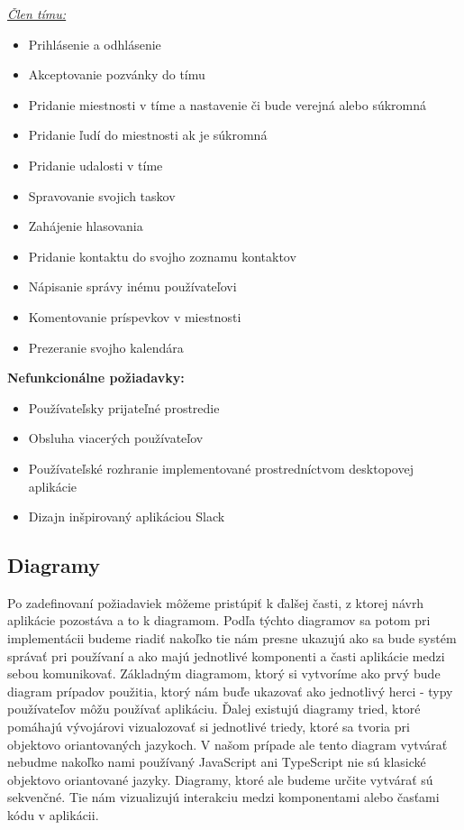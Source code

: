 \underline{\textit{Člen tímu:}}
\indent\begin{itemize}
    \item Prihlásenie a odhlásenie
    \item Akceptovanie pozvánky do tímu
    \item Pridanie miestnosti v tíme a nastavenie či bude verejná alebo súkromná
    \item Pridanie ľudí do miestnosti ak je súkromná
    \item Pridanie udalosti v tíme
    \item Spravovanie svojich taskov
    \item Zahájenie hlasovania
    \item Pridanie kontaktu do svojho zoznamu kontaktov
    \item Nápisanie správy inému používateľovi
    \item Komentovanie príspevkov v miestnosti
    \item Prezeranie svojho kalendára\newline
\end{itemize}


\textbf{Nefunkcionálne požiadavky:}
\indent\begin{itemize}
    \item Používateľsky prijateľné prostredie
    \item Obsluha viacerých používateľov
    \item Používateľské rozhranie implementované prostredníctvom desktopovej aplikácie
    \item Dizajn inšpirovaný aplikáciou Slack
\end{itemize}

\subsection{Diagramy}
\indent Po zadefinovaní požiadaviek môžeme pristúpiť k ďalšej časti, z ktorej návrh aplikácie pozostáva a to k diagramom. Podľa týchto diagramov sa potom pri implementácii budeme riadiť nakoľko tie nám presne ukazujú ako sa bude systém správať pri používaní a ako majú jednotlivé komponenti a časti aplikácie medzi sebou komunikovať. Základným diagramom, ktorý si vytvoríme ako prvý bude diagram prípadov použitia, ktorý nám buďe ukazovať ako jednotlivý herci - typy používateľov môžu používať aplikáciu. Ďalej existujú diagramy tried, ktoré pomáhajú vývojárovi vizualozovať si jednotlivé triedy, ktoré sa tvoria pri objektovo oriantovaných jazykoch. V našom prípade ale tento diagram vytvárať nebudme nakoľko nami používaný JavaScript ani TypeScript nie sú klasické objektovo oriantované jazyky. Diagramy, ktoré ale budeme určite vytvárať sú sekvenčné. Tie nám vizualizujú interakciu medzi komponentami alebo časťami kódu v aplikácii.


